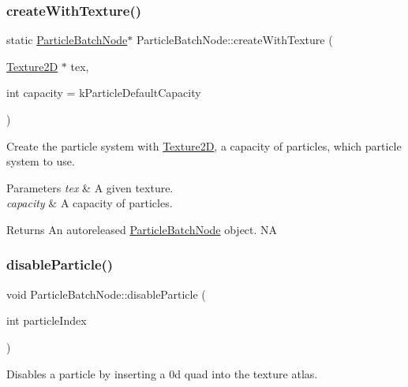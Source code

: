 \subsubsection{\texorpdfstring{create\+With\+Texture()}{createWithTexture()}\hspace{0.1cm}{\footnotesize\ttfamily [2/2]}}
{\footnotesize\ttfamily static \hyperlink{classParticleBatchNode}{Particle\+Batch\+Node}$\ast$ Particle\+Batch\+Node\+::create\+With\+Texture (\begin{DoxyParamCaption}\item[{\hyperlink{classTexture2D}{Texture2D} $\ast$}]{tex,  }\item[{int}]{capacity = {\ttfamily kParticleDefaultCapacity} }\end{DoxyParamCaption})\hspace{0.3cm}{\ttfamily [static]}}

Create the particle system with \hyperlink{classTexture2D}{Texture2D}, a capacity of particles, which particle system to use.


\begin{DoxyParams}{Parameters}
{\em tex} & A given texture. \\
\hline
{\em capacity} & A capacity of particles. \\
\hline
\end{DoxyParams}
\begin{DoxyReturn}{Returns}
An autoreleased \hyperlink{classParticleBatchNode}{Particle\+Batch\+Node} object.  NA 
\end{DoxyReturn}
\mbox{\label{classParticleBatchNode_a8041807df39f5cdfa35b5423bb5c4a17}} 
\subsubsection{\texorpdfstring{disable\+Particle()}{disableParticle()}\hspace{0.1cm}{\footnotesize\ttfamily [1/2]}}
{\footnotesize\ttfamily void Particle\+Batch\+Node\+::disable\+Particle (\begin{DoxyParamCaption}\item[{int}]{particle\+Index }\end{DoxyParamCaption})}

Disables a particle by inserting a 0\textquotesingle{}d quad into the texture atlas.


